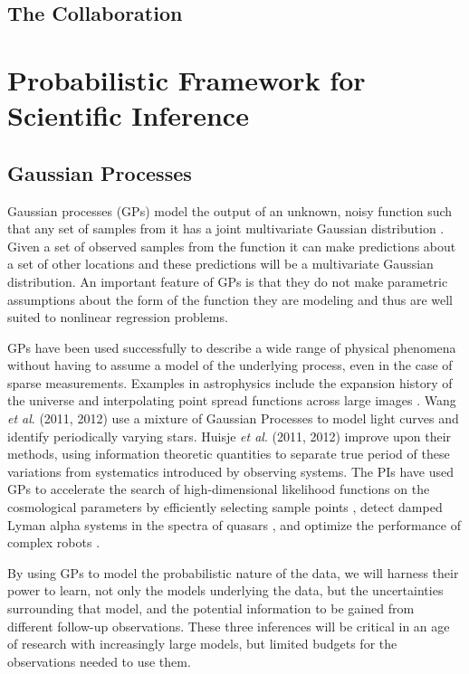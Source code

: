 \documentclass[useAMS,usenatbib,tightenlines,11pt,preprint]{aastex}
\begin{document}
\subsection{The Collaboration}

\section{Probabilistic Framework for Scientific Inference}

\subsection{Gaussian Processes}
\label{sec:gp}


Gaussian processes (GPs) model the output of an unknown, noisy function
such that any set of samples from it has a joint multivariate Gaussian
distribution \cite{gp}.  Given a set of observed samples from the function
it can make predictions about a set of other locations and these
predictions will be a multivariate Gaussian distribution.  An important
feature of GPs is that they do not make parametric assumptions about the
form of the function they are modeling and thus are well suited to
nonlinear regression problems.

GPs have been used successfully to describe a wide range of physical
phenomena without having to assume a model of the underlying process, even
in the case of sparse measurements.  Examples in astrophysics include the
expansion history of the universe \cite{ericgp} and interpolating point
spread functions across large images \cite{psf}.  Wang {\it et al}. (2011,
2012) use a mixture of Gaussian Processes to model light curves and
identify periodically varying stars.  Huisje {\it et al}. (2011, 2012)
improve upon their methods, using information theoretic quantities to
separate true period of these variations from systematics introduced by
observing systems.  The PIs have used GPs to accelerate the search of
high-dimensional likelihood functions on the cosmological parameters by
efficiently selecting sample points \cite{daniel2012}, detect damped Lyman
alpha systems in the spectra of quasars \cite{Garnett12a}, and optimize the
performance of complex robots \cite{Tesch11a,Tesch11b,Tesch13}.

By using GPs to model the probabilistic nature of the data, we will harness
their power to learn, not only the models underlying the data, but the
uncertainties surrounding that model, and the potential information to be
gained from different follow-up observations.  These three inferences will
be critical in an age of research with increasingly large models, but
limited budgets for the observations needed to use them.
\end{document}
